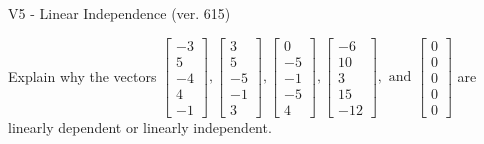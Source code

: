 \begin{exercise}
  \begin{exerciseTitle}V5 - Linear Independence (ver. 615)\end{exerciseTitle}
  \begin{exerciseStatement}
    Explain why the vectors \(\left[\begin{array}{r}
-3 \\
5 \\
-4 \\
4 \\
-1
\end{array}\right] , \left[\begin{array}{r}
3 \\
5 \\
-5 \\
-1 \\
3
\end{array}\right] , \left[\begin{array}{r}
0 \\
-5 \\
-1 \\
-5 \\
4
\end{array}\right] , \left[\begin{array}{r}
-6 \\
10 \\
3 \\
15 \\
-12
\end{array}\right] , \text{ and } \left[\begin{array}{r}
0 \\
0 \\
0 \\
0 \\
0
\end{array}\right]\) are linearly dependent or linearly independent.	



\end{exerciseStatement}
\end{exercise}
